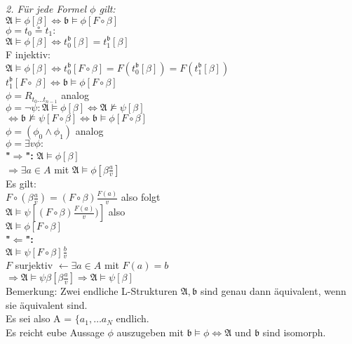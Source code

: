 \documentclass[a4paper]{scrartcl}
\newcommand{\mfa}{\mathfrak{A}}  %
\begin{document}
	\textit{2. Für jede Formel $\phi$ gilt:}\\
		$\mfa \models \phi \left[\beta \right] \Leftrightarrow \mathfrak{b} \models \phi \left[F \circ \beta \right]$\medskip\\
		$\phi = t_0 \circeq t_1:$\medskip\\
		$\mfa \models \phi \left[\beta \right] \Leftrightarrow t^{\mathfrak{b}}_{0}\left[ \beta \right] = t^{\mathfrak{b}}_{1}\left[ \beta \right]$\medskip\\
		F injektiv: \medskip\\
			$\mfa \models \phi \left[ \beta \right] \Leftrightarrow t_0^{\mathfrak{b}}\left[ F \circ \beta \right] = F(t^{\mathfrak{b}}_{0}\left[ \beta \right]) = F(t^{\mathfrak{b}}_{1}\left[ \beta \right])$\medskip\\
			$t_1^{\mathfrak{b}}\left[ F \circ \ \beta \right] \Leftrightarrow \mathfrak{b} \models \phi \left[ F \circ \beta \right]$\bigskip \\
		$\phi = R_{t_0 \dots t_{n-1}}$ analog \medskip \\
		$\phi = \lnot \psi : \mfa \models \phi \left[ \beta \right] \Leftrightarrow \mfa \nvDash \psi \left[ \beta \right] $\medskip \\
		$\Leftrightarrow \mathfrak{b} \nvDash \psi \left[ F \circ \beta \right] \Leftrightarrow \mathfrak{b} \models \phi \left[F \circ \beta \right]$ \medskip\\
		$\phi = (\phi_0 \wedge \phi_1)$ analog \medskip \\
		$\phi = \exists v \phi :$ \bigskip\\
		
		\textbf{"$\Rightarrow$":} $\mfa \models \phi \left[\beta\right]$ \medskip \\
			$\Rightarrow \exists a \in A $ mit $\mfa \models \phi \left[ \beta \frac{a}{v}\right]$ \medskip\\
			Es gilt:\\
			$F \circ (\beta\frac{a}{v}) = (F \circ \beta) \frac{F(a)}{v}$ also folgt\medskip\\
			$\mfa \models \psi \left[(F \circ \beta) \frac{F(a)}{v}) \right]$ also \medskip\\
			$\mfa \models \phi \left[F \circ \beta \right]$ \medskip\\
		
		\textbf{"$\Leftarrow$":}\medskip\\
			$\mfa \models \psi \left[ F \circ \beta \right] \frac{b}{v}$ \medskip\\	
			$F$ surjektiv $\leftarrow \exists a \in A$ mit $F(a) = b$\medskip\\
			$\Rightarrow \mfa \models \psi \beta \left[ \beta \frac{a}{v} \right] \Rightarrow \mfa \models \psi \left[ \beta \right]$ \bigskip\\
			Bemerkung: Zwei endliche L-Strukturen $\mfa, \mathfrak{b}$ sind genau dann äquivalent, wenn sie äquivalent sind.\bigskip\\
			Es sei also A = $\lbrace a_1, \dots a_N$ endlich.\\
			Es reicht eube Aussage $\phi$ auszugeben mit $\mathfrak{b} \models \phi \Leftrightarrow \mfa $ und $\mathfrak{b}$ sind isomorph. \medskip\\ 
			
\end{document}
